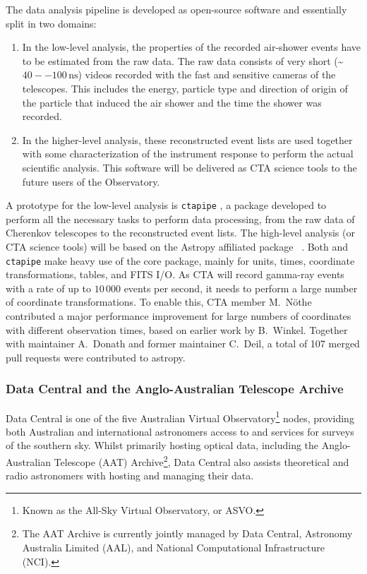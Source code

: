 \documentclass[modern]{aastex631}
\newcommand{\secauthor}[1]{{\color{blue}Author:~\textit{#1}}}
\begin{document}
The data analysis pipeline is developed as open-source software and essentially split in two domains:
\begin{enumerate}
  \item In the low-level analysis, the properties of the recorded air-shower events
    have to be estimated from the raw data.
    The raw data consists of very short (\textasciitilde $40--100\,\mathrm{ns}$) videos recorded with the fast and
    sensitive cameras of the telescopes.
    This includes the energy, particle type and direction of origin of the particle that induced the air shower
    and the time the shower was recorded.
  \item In the higher-level analysis, these reconstructed event lists are used together with some
    characterization of the instrument response to perform the actual scientific analysis.
    This software will be delivered as CTA science tools to the future users of the Observatory.
\end{enumerate}

A prototype for the low-level analysis is \texttt{ctapipe} \citep{ctapipe},
a \python package developed to perform all the necessary tasks to perform data processing, from the raw data
of Cherenkov telescopes to the reconstructed event lists.
The high-level analysis (or CTA science tools) will be based on the Astropy affiliated package
~\citep{gammapy}.
Both  and \texttt{ctapipe} make heavy use of the \astropy core package, mainly for units, times, coordinate transformations,
tables, and FITS I/O.
As CTA will record gamma-ray events with a rate of up to $10\,000$ events per second,
it needs to perform a large number of coordinate transformations.
To enable this, CTA member M.~Nöthe contributed a major performance improvement
for large numbers of coordinates with different observation times,
based on earlier work by B.~Winkel.
Together with  maintainer A.~Donath and former maintainer C.~Deil,
a total of 107 merged pull requests were contributed to astropy.

\subsubsection{Data Central and the Anglo-Australian Telescope Archive}
Data Central is one of the five Australian Virtual Observatory\footnote{Known as
  the All-Sky Virtual Observatory, or ASVO.} nodes, providing both Australian and
international astronomers access to and services for surveys of the southern
sky. Whilst primarily hosting optical data, including the Anglo-Australian
Telescope (AAT) Archive\footnote{The AAT Archive is currently jointly managed by
  Data Central, Astronomy Australia Limited (AAL), and National Computational
  Infrastructure (NCI).}, Data Central also assists theoretical and radio
astronomers with hosting and managing their data.
\end{document}
